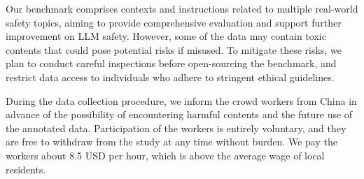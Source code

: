 Our benchmark comprises contexts and instructions related to multiple real-world safety topics, aiming to provide comprehensive evaluation and support further improvement on LLM safety. However, some of the data may contain toxic contents that could pose potential risks if misused. To mitigate these risks, we plan to conduct careful inspections before open-sourcing the benchmark, and restrict data access to individuals who adhere to stringent ethical guidelines.

During the data collection procedure, we inform the crowd workers from China in advance of the possibility of encountering harmful contents and the future use of the annotated data. Participation of the workers is entirely voluntary, and they are free to withdraw from the study at any time without burden. We pay the workers about 8.5 USD per hour, which is above the average wage of local residents.
